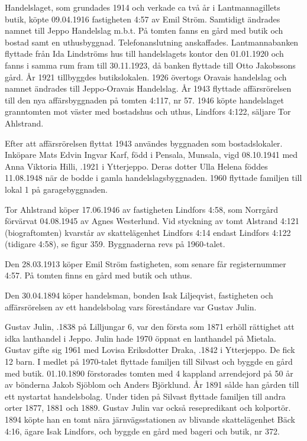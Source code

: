 


Handelslaget, som grundades 1914 och verkade ca två år i Lantmannagillets butik, köpte 09.04.1916 fastigheten 4:57 av Emil Ström.	Samtidigt ändrades namnet till Jeppo Handelslag m.b.t. På tomten fanns en gård med butik och bostad samt en uthusbyggnad. Telefonanslutning anskaffades. Lantmannabanken flyttade från Ida Lindströms	hus till handelslagets kontor den 01.01.1920 och fanns i samma rum fram	till 30.11.1923, då banken flyttade till Otto Jakobssons gård. År 1921 	tillbyggdes butikslokalen. 1926 övertogs Oravais handelslag och	namnet ändrades till Jeppo-Oravais Handelslag. År 1943 flyttade affärsrörelsen till den nya affärsbyggnaden på tomten 4:117, nr 57.	1946 köpte handelslaget granntomten mot väster med bostadshus och uthus, Lindfors 4:122, säljare Tor Ahlstrand.

Efter att affärsrörelsen flyttat 1943 användes byggnaden som bostadslokaler. Inköpare Mats Edvin Ingvar Karf, född i Pensala, Munsala, vigd 08.10.1941 med Anna Viktoria Hilli, .1921 i Ytterjeppo. Deras dotter Ulla Helena föddes 11.08.1948 när de bodde i 	gamla handelslagsbyggnaden. 1960 flyttade familjen till lokal 1 på 	garagebyggnaden.


Tor Ahlstrand köper 17.06.1946 av  fastigheten Lindfors 4:58, som Norrgård förvärvat 04.08.1945 av Agnes Westerlund.	Vid styckning av tomt Alstrand 4:121 (biograftomten) kvarstår av skattelägenhet Lindfors 4:14 endast Lindfors 4:122 (tidigare 4:58), se figur 359. Byggnaderna revs på 1960-talet.


Den 28.03.1913 köper Emil Ström fastigheten, som senare får	registernummer 4:57. På tomten finns en gård med butik och uthus.\jhvspace{}


Den 30.04.1894 köper handelsman, bonden Isak Liljeqvist, fastigheten och affärsrörelsen av ett handelsbolag vars föreståndare var Gustav Julin.\jhvspace{}


Gustav Julin, .1838 på Lilljungar 6, var den första som	1871 erhöll rättighet att idka lanthandel i Jeppo. Julin hade 1970 öppnat	en lanthandel på Mietala. Gustav gifte sig 1961 med Lovisa Eriksdotter Draka, .1842 i Ytterjeppo. De fick 12 barn. I medlet på 1970-talet flyttade familjen till Silvast och byggde en gård med butik. 01.10.1890 förstorades tomten med 4 kappland arrendejord på 50 år av bönderna Jakob Sjöblom och Anders Björklund. År 1891 sålde han gården till ett nystartat handelsbolag. Under tiden på Silvast flyttade familjen till andra orter 1877, 1881 och 1889. Gustav Julin var också resepredikant och kolportör. 1894 köpte han en tomt nära järnvägsstationen av blivande skattelägenhet Bäck 4:16, ägare Isak Lindfors, och byggde en gård med bageri och butik, nr 372.



